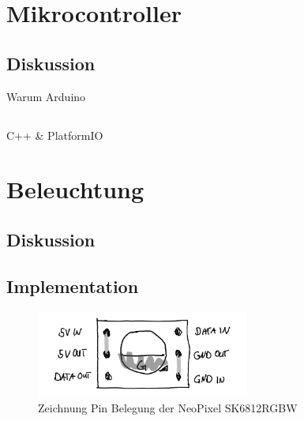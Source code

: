 \section{Mikrocontroller}
    \subsection{Diskussion}
        Warum Arduino

    \subsection{}
        C++ \& PlatformIO

\section{Beleuchtung}
    \subsection{Diskussion}

    \subsection{Implementation}

        \begin{figure}[H]
            \begin{center}
                \includegraphics[width=7cm]{media/03_technical_implementation/leds_2.png}
            \end{center}
            \caption{Zeichnung Pin Belegung der NeoPixel SK6812RGBW}
            \label{fig:leds_2}
        \end{figure}
    
